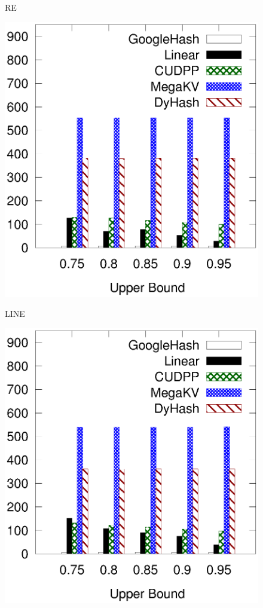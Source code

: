 \begin{figure}[t]
\begin{minipage}{0.19\linewidth}
		\centerline{RE}
	\end{minipage}
	\hfill
	\begin{minipage}{0.19\linewidth}\centering
		\includegraphics[width=\linewidth]{pic/static-upper/upper_search_tpch.eps}
		\centerline{LINE}
	\end{minipage}
	\hfill
	\begin{minipage}{0.19\linewidth}\centering
		\includegraphics[width=\linewidth]{pic/static-upper/upper_search_random.eps}

\end{minipage}
\end{figure}
